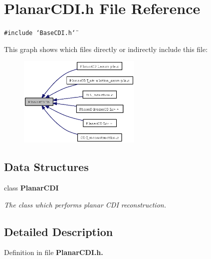 \section{Planar\-CDI.h File Reference}
\label{PlanarCDI_8h}
{\tt \#include \char`\"{}Base\-CDI.h\char`\"{}}\par


This graph shows which files directly or indirectly include this file:\begin{figure}[H]
\begin{center}
\leavevmode
\includegraphics[width=166pt]{PlanarCDI_8h__dep__incl}
\end{center}
\end{figure}
\subsection*{Data Structures}
\begin{CompactItemize}
\item 
class \bf{Planar\-CDI}
\begin{CompactList}\small\item\em The class which performs planar CDI reconstruction. \item\end{CompactList}\end{CompactItemize}


\subsection{Detailed Description}


Definition in file \bf{Planar\-CDI.h}.